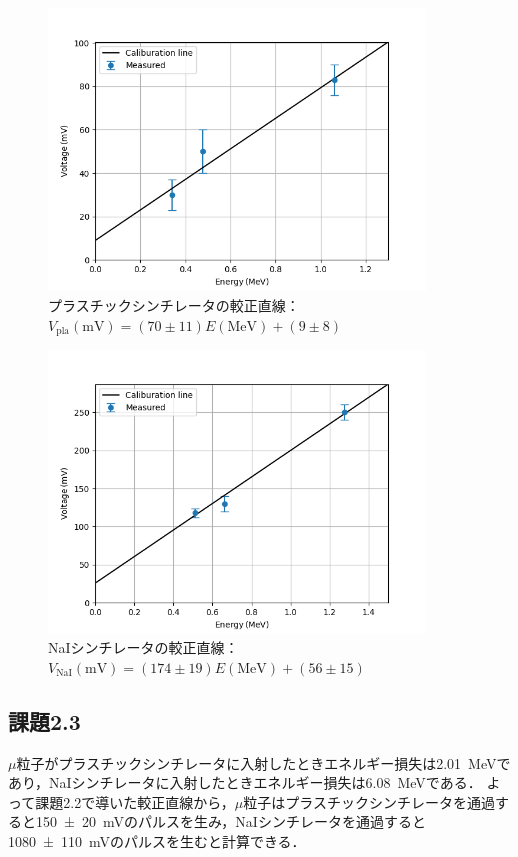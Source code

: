 \documentclass[a4paper,11pt]{jsarticle}
\begin{document}
\begin{figure}[htbp]
  \centering
  \includegraphics[width=10cm]{calib_pla.png}
  \caption{プラスチックシンチレータの較正直線：$V_{\mathrm{pla}}(\si{\mV}) = (70\pm 11) E(\si{\MeV}) + (9\pm 8)$}
  \label{fig:calib_pla}
\end{figure}

\begin{figure}[htbp]
  \centering
  \includegraphics[width=10cm]{calib_nai.png}
  \caption{NaIシンチレータの較正直線：$V_{\mathrm{NaI}}(\si{\mV}) = (174\pm 19) E(\si{\MeV}) + (56\pm 15)$}
  \label{fig:calib_nai}
\end{figure}

\subsection{課題2.3}
$\mu$粒子がプラスチックシンチレータに入射したときエネルギー損失は\SI{2.01}{\MeV}であり，NaIシンチレータに入射したときエネルギー損失は\SI{6.08}{\MeV}である．
よって課題2.2で導いた較正直線から，$\mu$粒子はプラスチックシンチレータを通過すると\SI[separate-uncertainty]{150\pm 20}{\mV}のパルスを生み，NaIシンチレータを通過すると\SI[separate-uncertainty]{1080\pm 110}{\mV}のパルスを生むと計算できる．
\end{document}
